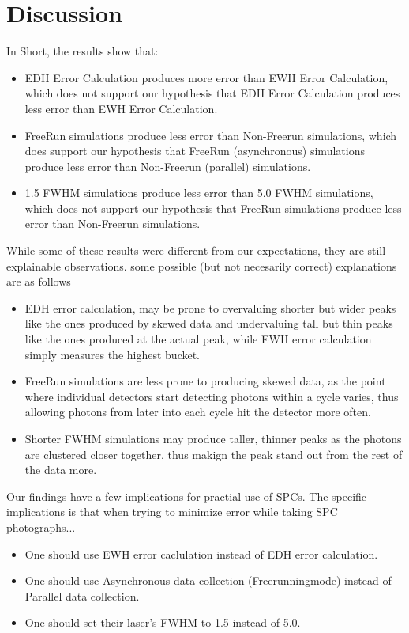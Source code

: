 \documentclass{article}
\begin{document}
\section*{Discussion}
In Short, the results show that:
\begin{itemize}
  \item EDH Error Calculation produces more error than EWH Error Calculation, which does not support our hypothesis that EDH Error Calculation produces less error than EWH Error Calculation.
  \item FreeRun simulations produce less error than Non-Freerun simulations, which does support our hypothesis that FreeRun (asynchronous) simulations produce less error than Non-Freerun (parallel) simulations.
  \item 1.5 FWHM simulations produce less error than 5.0 FWHM simulations, which does not support our hypothesis that FreeRun simulations produce less error than Non-Freerun simulations.
\end{itemize}
While some of these results were different from our expectations, they are still explainable observations. some possible (but not necesarily correct) explanations are as follows
\begin{itemize}
\item EDH error calculation, may be prone to overvaluing shorter but wider peaks like the ones produced by skewed data and undervaluing tall but thin peaks like the ones produced at the actual peak, while EWH error calculation simply measures the highest bucket.
  \item FreeRun simulations are less prone to producing skewed data, as the point where individual detectors start detecting photons within a cycle varies, thus allowing photons from later into each cycle hit the detector more often.
  \item Shorter FWHM simulations may produce taller, thinner peaks as the photons are clustered closer together, thus makign the peak stand out from the rest of the data more.
\end{itemize}
Our findings have a few implications for practial use of SPCs. The specific implications is that when trying to minimize error while taking SPC photographs...
\begin{itemize}
  \item One should use EWH error caclulation instead of EDH error calculation.
  \item One should use Asynchronous data collection (Freerunningmode) instead of Parallel data collection.
  \item One should set their laser's FWHM to 1.5 instead of 5.0.
\end{itemize}
\end{document}
